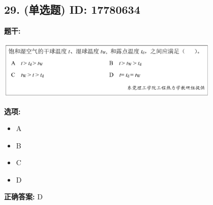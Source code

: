 \documentclass[12pt]{article}
\begin{document}
\vspace{0.5em}\hrulefill\vspace{1em}

\subsection*{29. (单选题) \small ID: 17780634}

\textbf{题干:}


\begin{center}\includegraphics[width=0.8\textwidth, height=0.25\textheight, keepaspectratio]{question_29_17780634/title_img_1.png}\end{center}

\textbf{选项:}
\begin{itemize}[leftmargin=*]
  \item A

  \item B

  \item C

  \item D

\end{itemize}

\textbf{正确答案:}
D

\vspace{0.5em}\hrulefill\vspace{1em}
\end{document}
